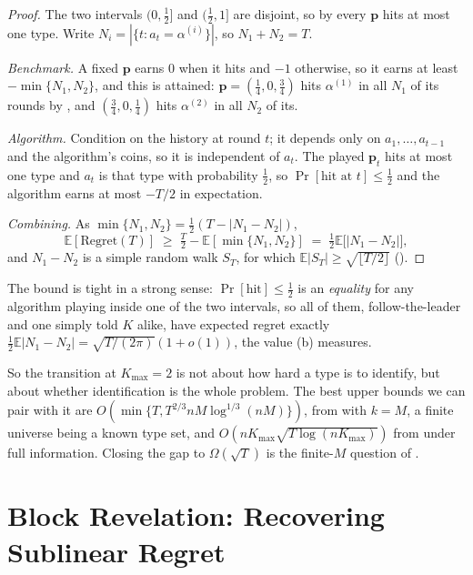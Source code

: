 \documentclass[letterpaper,9pt,twocolumn]{extarticle}
\newcommand{\pvec}{\mathbf{p}}
\newcommand{\EE}{\mathbb{E}}
\newcommand{\Kmax}{K_{\max}}
\newcommand{\Regret}{\mathrm{Regret}}
\theoremstyle{plain}
\theoremstyle{definition}
\theoremstyle{remark}
\begin{document}
\begin{proof}
The two intervals $(0,\tfrac12]$ and $(\tfrac12,1]$ are disjoint, so by
 every $\pvec$ hits at most one type. Write
$N_i=|\{t:a_t=\alpha^{(i)}\}|$, so $N_1+N_2=T$.

\emph{Benchmark.} A fixed $\pvec$ earns $0$ when it hits and $-1$ otherwise,
so it earns at least $-\min\{N_1,N_2\}$, and this is attained:
$\pvec=(\tfrac14,0,\tfrac34)$ hits $\alpha^{(1)}$ in all $N_1$ of its rounds
by , and $(\tfrac34,0,\tfrac14)$ hits $\alpha^{(2)}$ in all
$N_2$ of its.

\emph{Algorithm.} Condition on the history at round $t$; it depends only on
$a_1,\dots,a_{t-1}$ and the algorithm's coins, so it is independent of $a_t$.
The played $\pvec_t$ hits at most one type and $a_t$ is that type with
probability $\tfrac12$, so $\Pr[\text{hit at }t]\le\tfrac12$ and the algorithm
earns at most $-T/2$ in expectation.

\emph{Combining.} As $\min\{N_1,N_2\}=\tfrac12(T-|N_1-N_2|)$,
\[
\EE[\Regret(T)]\;\ge\;\tfrac{T}{2}-\EE[\min\{N_1,N_2\}]
\;=\;\tfrac{1}{2}\EE\bigl[|N_1-N_2|\bigr],
\]
and $N_1-N_2$ is a simple random walk $S_T$, for which
$\EE|S_T|\ge\sqrt{\lfloor T/2\rfloor}$ ().
\end{proof}

The bound is tight in a strong sense: $\Pr[\text{hit}]\le\tfrac12$ is an
\emph{equality} for any algorithm playing inside one of the two intervals, so
all of them, follow-the-leader and one simply told $K$ alike, have expected
regret exactly $\tfrac12\EE|N_1-N_2|=\sqrt{T/(2\pi)}(1+o(1))$, the value
(b) measures.

So the transition at $\Kmax=2$ is not about how hard a type is to identify,
but about whether identification is the whole problem. The best upper bounds
we can pair with it are $O(\min\{T,T^{2/3}nM\log^{1/3}(nM)\})$, from
\citet[Theorem 6.1]{balcan2015} with $k=M$, a finite universe being a known
type set, and $O(n\Kmax\sqrt{T\log(n\Kmax)})$ from  under full
information. Closing the gap to $\Omega(\sqrt T)$ is the finite-$M$ question
of .

\section{Block Revelation: Recovering Sublinear Regret}
\label{sec:block}
\end{document}
